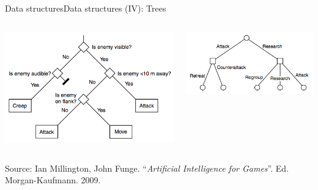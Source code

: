 \documentclass[10pt,compress]{beamer} %
\begin{document}
\begin{frame}{Data structures}{Data structures (IV): Trees}
    \begin{columns}
	   	\begin{center}
		\vspace{-0.2cm}
		\includegraphics[width=\linewidth]{figs/tree4.png}
		\end{center}

		\begin{center}
		\vspace{-0.2cm}
		\includegraphics[width=\linewidth]{figs/tree5.png}
		\end{center}
		\end{columns}

	\bigskip
	\tiny
	\begin{center}
	Source: Ian Millington, John Funge. ``\textit{Artificial Intelligence for Games}''. Ed. Morgan-Kaufmann. 2009.
	\end{center}
\end{frame}
\end{document}
